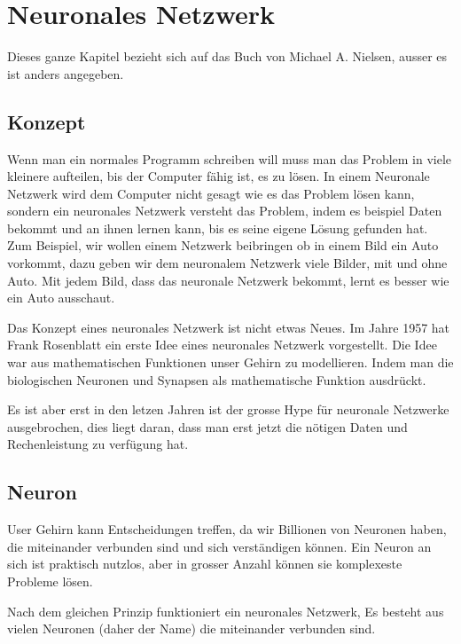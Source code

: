 \documentclass[12pt,a4paper]{report}
\begin{document}
\chapter{Neuronales Netzwerk}
\label{ch:neuronalesNetzwerk}
Dieses ganze Kapitel bezieht sich auf das Buch von Michael A. Nielsen\cite{neuralbook}, ausser es ist anders angegeben.
\section{Konzept}\label{sec:konzept}
Wenn man ein normales Programm schreiben will muss man das Problem in viele kleinere aufteilen, bis der Computer fähig ist,
es zu lösen.
In einem Neuronale Netzwerk wird dem Computer nicht gesagt wie es das Problem lösen kann, sondern ein neuronales Netzwerk
versteht das Problem, indem es beispiel Daten bekommt und an ihnen lernen kann, bis es seine eigene Lösung gefunden hat.
Zum Beispiel, wir wollen einem Netzwerk beibringen ob in einem Bild ein Auto vorkommt,
dazu geben wir dem neuronalem Netzwerk viele Bilder, mit und ohne Auto.
Mit jedem Bild, dass das neuronale Netzwerk bekommt, lernt es besser wie ein Auto ausschaut.

Das Konzept eines neuronales Netzwerk ist nicht etwas Neues.
Im Jahre 1957 hat Frank Rosenblatt ein erste Idee eines neuronales Netzwerk vorgestellt.
Die Idee war aus mathematischen Funktionen unser Gehirn zu modellieren.
Indem man die biologischen Neuronen und Synapsen als mathematische Funktion ausdrückt.

Es ist aber erst in den letzen Jahren ist der grosse Hype für neuronale Netzwerke ausgebrochen,
dies liegt daran, dass man erst jetzt die nötigen Daten
und Rechenleistung zu verfügung hat.

\section{Neuron}\label{sec:neuron}
User Gehirn kann Entscheidungen treffen, da wir Billionen von Neuronen haben, die miteinander verbunden sind und sich
verständigen können.
Ein Neuron an sich ist praktisch nutzlos, aber in grosser Anzahl können sie komplexeste Probleme lösen.

Nach dem gleichen Prinzip funktioniert ein neuronales Netzwerk,
Es besteht aus vielen Neuronen (daher der Name) die miteinander verbunden sind.
\end{document}
